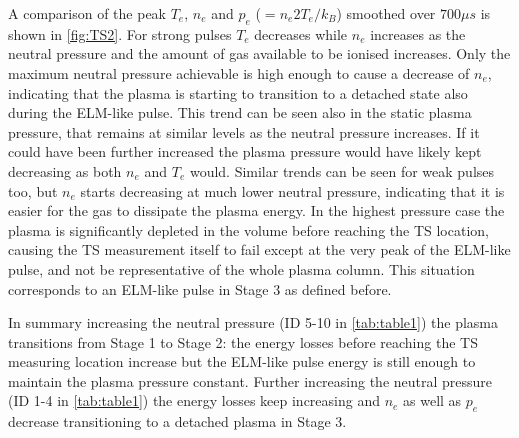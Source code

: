 A comparison of the peak $T_e$, $n_e$ and $p_e$ ($=n_e2T_e/k_B$) smoothed over $700 \mu s$ is shown in \autoref{fig:TS2}. For strong pulses $T_e$ decreases while $n_e$ increases as the neutral pressure and the amount of gas available to be ionised increases. Only the maximum neutral pressure achievable is high enough to cause a decrease of $n_e$, indicating that the plasma is starting to transition to a detached state also during the ELM-like pulse. This trend can be seen also in the static plasma pressure, that remains at similar levels as the neutral pressure increases. If it could have been further increased the plasma pressure would have likely kept decreasing as both $n_e$ and $T_e$ would. Similar trends can be seen for weak pulses too, but $n_e$ starts decreasing at much lower neutral pressure, indicating that it is easier for the gas to dissipate the plasma energy. In the highest pressure case the plasma is significantly depleted in the volume before reaching the TS location, causing the TS measurement itself to fail except at the very peak of the ELM-like pulse, and not be representative of the whole plasma column. This situation corresponds to an ELM-like pulse in Stage 3 as defined before.

In summary increasing the neutral pressure (ID 5-10 in \autoref{tab:table1}) the plasma transitions from Stage 1 to Stage 2: the energy losses before reaching the TS measuring location increase but the ELM-like pulse energy is still enough to maintain the plasma pressure constant. Further increasing the neutral pressure (ID 1-4 in \autoref{tab:table1}) the energy losses keep increasing and $n_e$ as well as $p_e$ decrease transitioning to a detached plasma in Stage 3.



